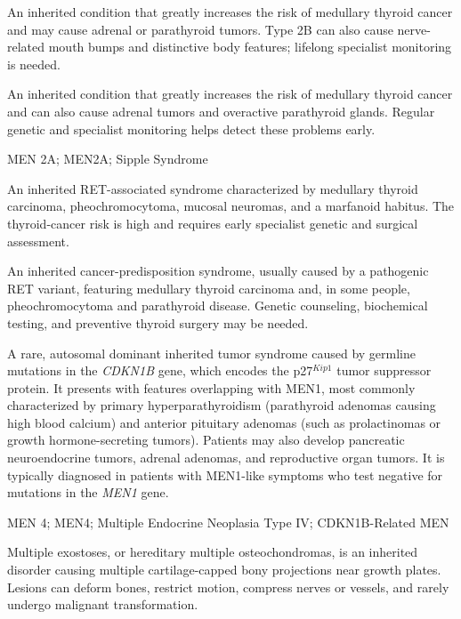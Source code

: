  An inherited condition that greatly increases the risk of medullary thyroid cancer and may cause adrenal or parathyroid tumors. Type 2B can also cause nerve-related mouth bumps and distinctive body features; lifelong specialist monitoring is needed.

 An inherited condition that greatly increases the risk of medullary thyroid cancer and can also cause adrenal tumors and overactive parathyroid glands. Regular genetic and specialist monitoring helps detect these problems early.

\synonyms
MEN 2A; MEN2A; Sipple Syndrome

 An inherited RET-associated syndrome characterized by medullary thyroid
carcinoma, pheochromocytoma, mucosal neuromas, and a marfanoid habitus. The thyroid-cancer risk is high and requires
early specialist genetic and surgical assessment.

 An inherited cancer-predisposition syndrome, usually caused by a pathogenic RET variant, featuring medullary thyroid carcinoma and, in some people, pheochromocytoma and parathyroid disease. Genetic counseling, biochemical testing, and preventive thyroid surgery may be needed.

 A rare, autosomal dominant inherited tumor syndrome caused by germline mutations in the \textit{CDKN1B} gene, which encodes the p27$^{Kip1}$ tumor suppressor protein. It presents with features overlapping with MEN1, most commonly characterized by primary hyperparathyroidism (parathyroid adenomas causing high blood calcium) and anterior pituitary adenomas (such as prolactinomas or growth hormone-secreting tumors). Patients may also develop pancreatic neuroendocrine tumors, adrenal adenomas, and reproductive organ tumors. It is typically diagnosed in patients with MEN1-like symptoms who test negative for mutations in the \textit{MEN1} gene.

\synonyms
MEN 4; MEN4; Multiple Endocrine Neoplasia Type IV; CDKN1B-Related MEN

 Multiple exostoses, or hereditary multiple osteochondromas, is an inherited disorder causing multiple cartilage-capped bony projections near growth plates. Lesions can deform bones, restrict motion, compress nerves or vessels, and rarely undergo malignant transformation.

